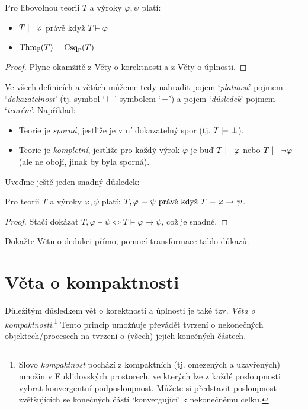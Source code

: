 \begin{corollary}[Dokazatelnost = platnost]\label{corollary:corollary-of-soundness-and-completeness}
    Pro libovolnou teorii $T$ a výroky $\varphi,\psi$ platí:
    \begin{itemize}
        \item $T\proves\varphi$ právě když $T\models\varphi$
        \item $\operatorname{Thm}_\mathbb P(T)=\operatorname{Csq}_\mathbb P(T)$
    \end{itemize}
\end{corollary}
\begin{proof}
    Plyne okamžitě z Věty o korektnosti a z Věty o úplnosti.
\end{proof}


Ve všech definicích a větách můžeme tedy nahradit pojem `\emph{platnost}' pojmem `\emph{dokazatelnost}' (tj. symbol `$\models$' symbolem `$\proves$') a  pojem `\emph{důsledek}' pojmem `\emph{teorém}'. Například:
\begin{itemize}
    \item Teorie je \emph{sporná}, jestliže je v ní dokazatelný spor (tj. $T\proves\bot$).
    \item Teorie je \emph{kompletní}, jestliže pro každý výrok $\varphi$ je buď $T\proves\varphi$ nebo $T\proves\neg\varphi$ (ale ne obojí, jinak by byla sporná).
\end{itemize}

Uveďme ještě jeden snadný důsledek:

\begin{theorem}[O dedukci]
Pro teorii $T$ a výroky $\varphi,\psi$ platí:
$T,\varphi\proves\psi\text{ právě když }T\proves\varphi\to\psi$.
\end{theorem}
\begin{proof}
    Stačí dokázat $T,\varphi\models\psi\Leftrightarrow T\models\varphi\to\psi$, což je snadné.
\end{proof}

\begin{exercise}
Dokažte Větu o dedukci přímo, pomocí transformace tablo důkazů.
\end{exercise}


\section{Věta o kompaktnosti}

Důležitým důsledkem vět o korektnosti a úplnosti je také tzv. \emph{Věta o kompaktnosti}.\footnote{Slovo \emph{kompaktnost} pochází z kompaktních (tj. omezených a uzavřených) množin v Euklidovských prostorech, ve kterých lze z každé posloupnosti vybrat konvergentní podposloupnost. Můžete si představit posloupnost zvětšujících se konečných částí `konvergující' k nekonečnému celku.} Tento princip umožňuje převádět tvrzení o nekonečných objektech/procesech na tvrzení o (všech) jejich konečných částech.

